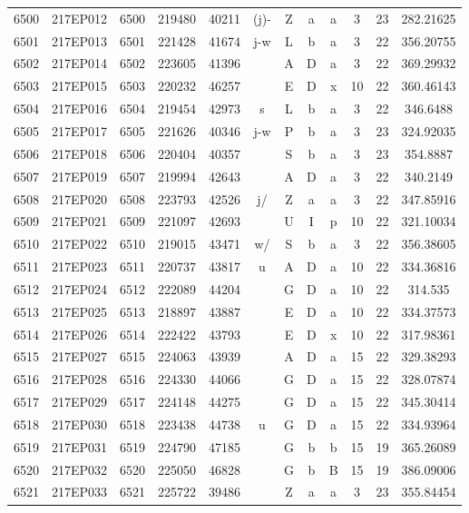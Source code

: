 \begin{tabular}{|*{12}{c|}}
6500 & 217EP012 & 6500 & 219480 & 40211 & (j)- & Z & a & a & 3 & 23 & 282.21625 \\ 
6501 & 217EP013 & 6501 & 221428 & 41674 & j-w & L & b & a & 3 & 22 & 356.20755 \\ 
6502 & 217EP014 & 6502 & 223605 & 41396 &  & A & D & a & 3 & 22 & 369.29932 \\ 
6503 & 217EP015 & 6503 & 220232 & 46257 &  & E & D & x & 10 & 22 & 360.46143 \\ 
6504 & 217EP016 & 6504 & 219454 & 42973 & s & L & b & a & 3 & 22 & 346.6488 \\ 
6505 & 217EP017 & 6505 & 221626 & 40346 & j-w & P & b & a & 3 & 23 & 324.92035 \\ 
6506 & 217EP018 & 6506 & 220404 & 40357 &  & S & b & a & 3 & 23 & 354.8887 \\ 
6507 & 217EP019 & 6507 & 219994 & 42643 &  & A & D & a & 3 & 22 & 340.2149 \\ 
6508 & 217EP020 & 6508 & 223793 & 42526 & j/ & Z & a & a & 3 & 22 & 347.85916 \\ 
6509 & 217EP021 & 6509 & 221097 & 42693 &  & U & I & p & 10 & 22 & 321.10034 \\ 
6510 & 217EP022 & 6510 & 219015 & 43471 & w/ & S & b & a & 3 & 22 & 356.38605 \\ 
6511 & 217EP023 & 6511 & 220737 & 43817 & u & A & D & a & 10 & 22 & 334.36816 \\ 
6512 & 217EP024 & 6512 & 222089 & 44204 &  & G & D & a & 10 & 22 & 314.535 \\ 
6513 & 217EP025 & 6513 & 218897 & 43887 &  & E & D & a & 10 & 22 & 334.37573 \\ 
6514 & 217EP026 & 6514 & 222422 & 43793 &  & E & D & x & 10 & 22 & 317.98361 \\ 
6515 & 217EP027 & 6515 & 224063 & 43939 &  & A & D & a & 15 & 22 & 329.38293 \\ 
6516 & 217EP028 & 6516 & 224330 & 44066 &  & G & D & a & 15 & 22 & 328.07874 \\ 
6517 & 217EP029 & 6517 & 224148 & 44275 &  & G & D & a & 15 & 22 & 345.30414 \\ 
6518 & 217EP030 & 6518 & 223438 & 44738 & u & G & D & a & 15 & 22 & 334.93964 \\ 
6519 & 217EP031 & 6519 & 224790 & 47185 &  & G & b & b & 15 & 19 & 365.26089 \\ 
6520 & 217EP032 & 6520 & 225050 & 46828 &  & G & b & B & 15 & 19 & 386.09006 \\ 
6521 & 217EP033 & 6521 & 225722 & 39486 &  & Z & a & a & 3 & 23 & 355.84454 \\ 

\end{tabular}
